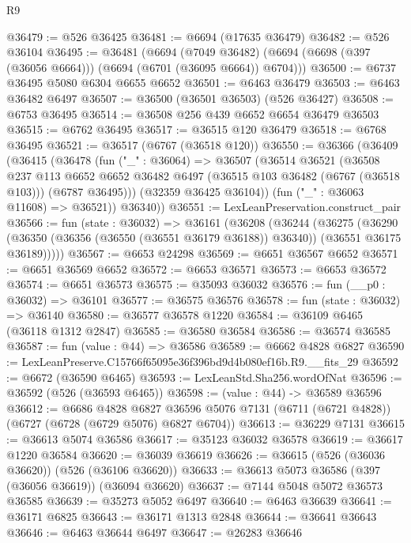\begin{lexlean}{R9}
\begin{coremodule}
@36479 := @526 @36425
@36481 := @6694 (@17635 @36479)
@36482 := @526 @36104
@36495 := @36481
    (@6694
      (@7049 @36482)
      (@6694 (@6698 (@397 (@36056 @6664))) (@6694 (@6701 (@36095 @6664)) @6704)))
@36500 := @6737 @36495 @5080 @6304 @6655 @6652
@36501 := @6463 @36479
@36503 := @6463 @36482 @6497
@36507 := @36500 (@36501 @36503) (@526 @36427)
@36508 := @6753 @36495
@36514 := @36508 @256 @439 @6652 @6654 @36479 @36503
@36515 := @6762 @36495
@36517 := @36515 @120 @36479
@36518 := @6768 @36495
@36521 := @36517 (@6767 (@36518 @120))
@36550 := @36366
    (@36409
      (@36415
        (@36478
          (fun ("_" : @36064) =>
          @36507
            (@36514
              @36521
              (@36508
                @237
                @113
                @6652
                @6652
                @36482
                @6497
                (@36515 @103 @36482 (@6767 (@36518 @103)))
                (@6787 @36495)))
            (@32359 @36425 @36104))
          (fun ("_" : @36063 @11608) => @36521))
        @36340))
@36551 := LexLeanPreservation.construct_pair
@36566 := fun (state : @36032) =>
  @36161
    (@36208
      (@36244
        (@36275
          (@36290
            (@36350 (@36356 (@36550 (@36551 @36179 @36188)) @36340))
            (@36551 @36175 @36189)))))
@36567 := @6653 @24298
@36569 := @6651 @36567 @6652
@36571 := @6651 @36569 @6652
@36572 := @6653 @36571
@36573 := @6653 @36572
@36574 := @6651 @36573
@36575 := @35093 @36032
@36576 := fun (__p0 : @36032) => @36101
@36577 := @36575 @36576
@36578 := fun (state : @36032) => @36140
@36580 := @36577 @36578 @1220
@36584 := @36109 @6465 (@36118 @1312 @2847)
@36585 := @36580 @36584
@36586 := @36574 @36585
@36587 := fun (value : @44) => @36586
@36589 := @6662 @4828 @6827
@36590 := LexLeanPreserve.C15766f65095e36f396bd9d4b080ef16b.R9.__fits_29
@36592 := @6672 (@36590 @6465)
@36593 := LexLeanStd.Sha256.wordOfNat
@36596 := @36592 (@526 (@36593 @6465))
@36598 := (value : @44) -> @36589 @36596
@36612 := @6686
    @4828
    @6827
    @36596
    @5076
    @7131
    (@6711 (@6721 @4828))
    (@6727 (@6728 (@6729 @5076) @6827 @6704))
@36613 := @36229 @7131
@36615 := @36613 @5074 @36586
@36617 := @35123 @36032 @36578
@36619 := @36617 @1220 @36584
@36620 := @36039 @36619
@36626 := @36615 (@526 (@36036 @36620)) (@526 (@36106 @36620))
@36633 := @36613 @5073 @36586 (@397 (@36056 @36619)) (@36094 @36620)
@36637 := @7144 @5048 @5072 @36573 @36585
@36639 := @35273 @5052 @6497
@36640 := @6463 @36639
@36641 := @36171 @6825
@36643 := @36171 @1313 @2848
@36644 := @36641 @36643
@36646 := @6463 @36644 @6497
@36647 := @26283 @36646

\end{coremodule}
\end{lexlean}
